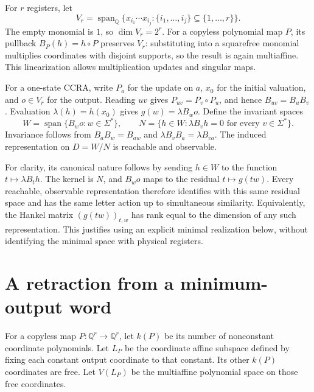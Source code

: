 \documentclass[acmlarge,screen,11pt,nonacm]{acmart}
\newcommand{\Q}{\mathbb{Q}}
\newcommand{\spn}{\operatorname{span}}
\theoremstyle{definition}
\begin{document}
For $r$ registers, let
\[
 V_r=\spn_\Q\{x_{i_1}\cdots x_{i_j}:\{i_1,\ldots,i_j\}\subseteq\{1,\ldots,r\}\}.
\]
The empty monomial is $1$, so $\dim V_r=2^r$. For a copyless polynomial map $P$, its pullback $B_P(h)=h\circ P$ preserves $V_r$: substituting into a squarefree monomial multiplies coordinates with disjoint supports, so the result is again multiaffine. This linearization allows multiplication updates and singular maps.

For a one-state CCRA, write $P_a$ for the update on $a$, $x_0$ for the initial valuation, and $o\in V_r$ for the output. Reading $uv$ gives $P_{uv}=P_v\circ P_u$, and hence $B_{uv}=B_uB_v$. Evaluation $\lambda(h)=h(x_0)$ gives $g(w)=\lambda B_w o$. Define the invariant spaces
\begin{equation}\label{eq:WN}
 W=\spn\{B_w o:w\in\Sigma^*\},\qquad
 N=\{h\in W:\lambda B_vh=0\text{ for every }v\in\Sigma^*\}.
\end{equation}
Invariance follows from $B_aB_w=B_{aw}$ and $\lambda B_vB_a=\lambda B_{va}$. The induced representation on $D=W/N$ is reachable and observable.

For clarity, its canonical nature follows by sending $h\in W$ to the function $t\mapsto\lambda B_t h$. The kernel is $N$, and $B_w o$ maps to the residual $t\mapsto g(tw)$. Every reachable, observable representation therefore identifies with this same residual space and has the same letter action up to simultaneous similarity. Equivalently, the Hankel matrix $(g(tw))_{t,w}$ has rank equal to the dimension of any such representation. This justifies using an explicit minimal realization below, without identifying the minimal space with physical registers.

\section{A retraction from a minimum-output word}\label{sec:retraction}
For a copyless map $P:\Q^r\to\Q^r$, let $k(P)$ be its number of nonconstant coordinate polynomials. Let $L_P$ be the coordinate affine subspace defined by fixing each constant output coordinate to that constant. Its other $k(P)$ coordinates are free. Let $V(L_P)$ be the multiaffine polynomial space on those free coordinates.
\end{document}

